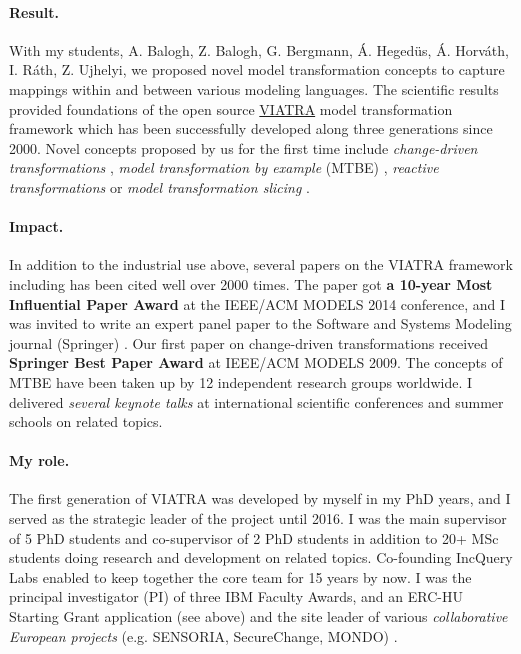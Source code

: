 \paragraph{Result.}
With my students, A. Balogh, Z. Balogh, G. Bergmann, Á. Hegedüs, Á. Horváth, I. Ráth, Z. Ujhelyi, we proposed novel model transformation concepts to capture mappings within and between various modeling languages. The scientific results provided foundations of the open source \href{https://www.eclipse.org/viatra/}{VIATRA} model transformation framework \cite{SCP2002,ASE2002,uml2004-meta,scp-2007,sosym2016-viatra-invited} which has been successfully developed along three generations since 2000. Novel concepts proposed by us for the first time include \emph{change-driven transformations} \cite{Rath-models09,sosym2011-cdt}, \emph{model transformation by example} (MTBE) \cite{models2006-varro,sosym2008-mtbe}, \emph{reactive transformations} \cite{icmt08-rbov08,icmt2015,sosym2016-viatra-invited} or \emph{model transformation slicing} \cite{ase2011-mtslice,icst2012}.

\paragraph{Impact.} 
In addition to the industrial use above, several papers on the VIATRA framework including \cite{SCP2002,ASE2002,uml2004-meta,models2006-varro,scp-2007,Bergmann-icmt09,Rath-sosym09,Rath-models09,Bergmann-sttt10} has been cited well over 2000 times. The paper \cite{uml2004-meta} got \textbf{a 10-year Most Influential Paper Award} at the IEEE/ACM MODELS 2014 conference, and I was invited to write an expert panel paper to the Software and Systems Modeling journal (Springer) \cite{sosym2016-viatra-invited}. Our first paper on change-driven transformations \cite{Rath-models09} received \textbf{Springer Best Paper Award} at IEEE/ACM MODELS 2009. The concepts of MTBE have been taken up by 12 independent research groups worldwide. I delivered \emph{several keynote talks} at international scientific conferences and summer schools on related topics.

\paragraph{My role.} 
The first generation of VIATRA was developed by myself in my PhD years, and I served as the strategic leader of the project until 2016. I was the main supervisor of 5 PhD students and co-supervisor of 2 PhD students in addition to 20+ MSc students doing research and development on related topics. Co-founding IncQuery Labs enabled to keep together the core team for 15 years by now. I was the principal investigator (PI) of three IBM Faculty Awards, and an ERC-HU Starting Grant application (see above) and the site leader of various \emph{collaborative European projects} (e.g. SENSORIA, SecureChange, MONDO) .

